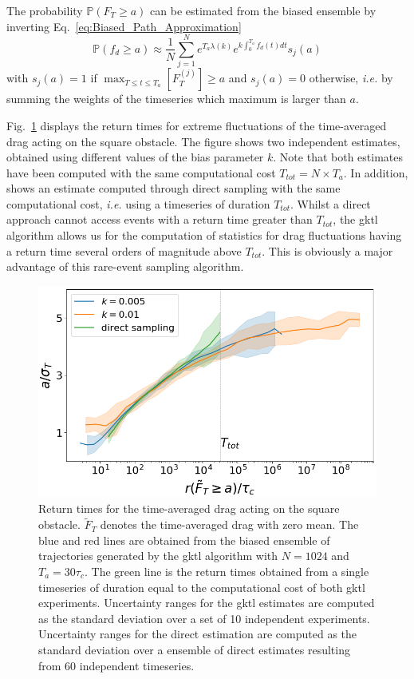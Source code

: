 \documentclass{jfm}
\newcommand{\EL}[1]{{\color{myred}{#1}}}
\begin{document}
The probability $\mathbb{P}(F_T \geq a)$ can be estimated from the biased ensemble by inverting Eq.~\eqref{eq:Biased_Path_Approximation}
\begin{equation}
\mathbb{P}(f_d \geq a) \approx \frac{1}{N}\sum_{j=1}^{N}e^{T_a \lambda(k)}e^{k \int_{0}^{T_a}f_d(t)dt}s_j(a)
\end{equation}
with $s_j(a) = 1$ if $\max_{T\leq t \leq T_a}[F_T^{(j)}] \geq a$ and $s_j(a) = 0$ otherwise, \emph{i.e.} by summing the weights of the timeseries which maximum is larger than $a$.

Fig.~\ref{fig:return_times_gktl} displays the return times for extreme fluctuations of the time-averaged drag acting on the square obstacle.
The figure shows two independent estimates, obtained using different values of the bias parameter $k$.
Note that both estimates have been computed with the same computational cost $T_{tot}=N\times T_a$.
In addition, \EL{Fig.~\ref{fig:return_times_gktl}} shows an estimate computed through direct sampling with the same computational cost, \textit{i.e.} using a timeseries of duration $T_{tot}$.
Whilst a direct approach cannot access events with a return time greater than $T_{tot}$, the \ac{gktl} algorithm allows us for the computation of statistics for drag fluctuations having a return time several orders of magnitude above $T_{tot}$. This is  obviously a major advantage of this rare-event sampling algorithm. 

\begin{figure}
	\centering
	\includegraphics[width=.7\linewidth]{return_times_GKTL/return_times_GKTL}
	\caption{\label{fig:return_times_gktl} Return times for the time-averaged drag acting on the square obstacle. $\tilde{F}_T$ denotes the time-averaged drag with zero mean. The blue and red lines are obtained from the biased ensemble of trajectories generated by the \ac{gktl} algorithm with $N=1024$ and $T_a=30\tau_c$. The green line is the return times obtained from a single timeseries of duration equal to the computational cost of both \ac{gktl} experiments. Uncertainty ranges for the \ac{gktl} estimates are computed as the standard deviation over a set of 10 independent experiments. Uncertainty ranges for the direct estimation are computed as the standard deviation over a ensemble of direct estimates resulting from 60 independent timeseries.}
\end{figure}
\end{document}
